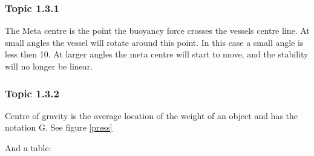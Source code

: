 \subsubsection{Topic 1.3.1}
The Meta centre is the point the buoyancy force crosses the vessels centre line.
At small angles the vessel will rotate around this point.
In this case a small angle is less then 10\degree. 
At larger angles the meta centre will start to move, and the stability will no longer be linear.

\subsubsection{Topic 1.3.2}
Centre of gravity is the average location of the weight of an object and has the notation G.
See figure \ref{press}


And a table:

